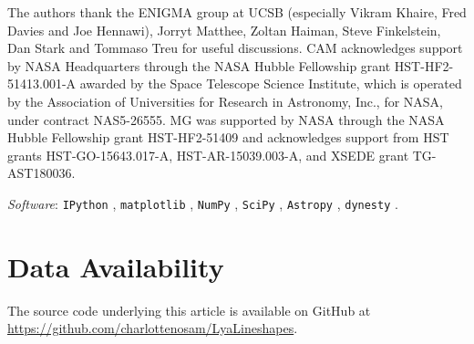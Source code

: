 \documentclass[fleqn,usenatbib]{mnras}
\begin{document}
The authors thank the ENIGMA group at UCSB (especially Vikram Khaire, Fred Davies and Joe Hennawi), Jorryt Matthee, Zoltan Haiman, Steve Finkelstein, Dan Stark and Tommaso Treu for useful discussions. CAM acknowledges support by NASA Headquarters through the NASA Hubble Fellowship grant HST-HF2-51413.001-A awarded by the Space Telescope Science Institute, which is operated by the Association of Universities for Research in Astronomy, Inc., for NASA, under contract NAS5-26555. MG was supported by NASA through the NASA Hubble Fellowship grant HST-HF2-51409 and acknowledges support from HST grants HST-GO-15643.017-A, HST-AR-15039.003-A, and XSEDE grant TG-AST180036.

\noindent
\textit{Software}: \verb|IPython| \citep{Perez2007a}, \verb|matplotlib| \citep{Hunter2007a}, \verb|NumPy| \citep{VanderWalt2011a}, \verb|SciPy| \citep{Oliphant2007a}, \verb|Astropy| \citep{Robitaille2013}, \verb|dynesty| \citep{Speagle2019}.

\section*{Data Availability}
The source code underlying this article is available on GitHub at \url{https://github.com/charlottenosam/LyaLineshapes}.







\bsp	%
\label{lastpage}
\end{document}
